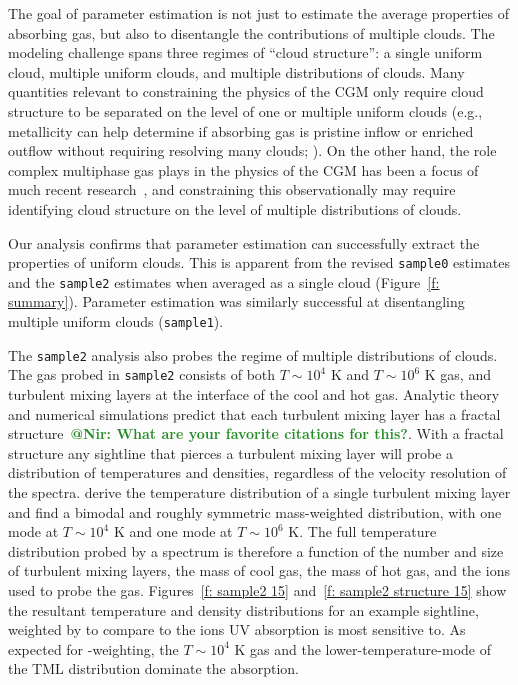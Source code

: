 \documentclass[fleqn,usenatbib]{mnras}
\makeatletter
\newcommand{\atnir}[1]{\textcolor{ForestGreen}{\textbf{@Nir: #1}}}
\makeatother
\begin{document}
The goal of parameter estimation is not just to estimate the average properties of absorbing gas,
but also to disentangle the contributions of multiple clouds.
The modeling challenge spans three regimes of ``cloud structure'':
a single uniform cloud,
multiple uniform clouds,
and multiple distributions of clouds.
Many quantities relevant to constraining the physics of the CGM only require cloud structure to be separated on the level of one or multiple uniform clouds (e.g., metallicity can help determine if absorbing gas is pristine inflow or enriched outflow without requiring resolving many clouds; \citealt{hafen2017Lowredshift}).
On the other hand, the role complex multiphase gas plays in the physics of the CGM has been a focus of much recent research~\citep[e.g.][]{voit2015Precipitationregulated, esmerian2021Thermal, smith2023Arkenstone, tan2023Cloudy},
and constraining this observationally may require identifying cloud structure on the level of multiple distributions of clouds.

Our analysis confirms that parameter estimation can successfully extract the properties of uniform clouds.
This is apparent from the revised \texttt{sample0} estimates and the \texttt{sample2} estimates when averaged as a single cloud (Figure~\ref{f: summary}).
Parameter estimation was similarly successful at disentangling multiple uniform clouds (\texttt{sample1}).

The \texttt{sample2} analysis also probes the regime of multiple distributions of clouds.
The gas probed in \texttt{sample2} consists of both $T \sim 10^4$ K and $T \sim 10^6$ K gas,
and turbulent mixing layers at the interface of the cool and hot gas.
Analytic theory and numerical simulations predict that each turbulent mixing layer has a fractal structure~\atnir{What are your favorite citations for this?}.
With a fractal structure any sightline that pierces a turbulent mixing layer will probe a distribution of temperatures and densities, regardless of the velocity resolution of the spectra.
\cite{Tan2021Model} derive the temperature distribution of a single turbulent mixing layer and find a bimodal and roughly symmetric mass-weighted distribution, with one mode at $T\sim 10^4$ K and one mode at $T\sim10^6$ K.
The full temperature distribution probed by a spectrum is therefore a function of the number and size of turbulent mixing layers, the mass of cool gas, the mass of hot gas, and the ions used to probe the gas.
Figures~\ref{f: sample2 15} and~\ref{f: sample2 structure 15} show the resultant temperature and density distributions for an example sightline, weighted by  to compare to the ions UV absorption is most sensitive to.
As expected for -weighting, the $T\sim10^4$ K gas and the lower-temperature-mode of the TML distribution dominate the absorption.
\end{document}
